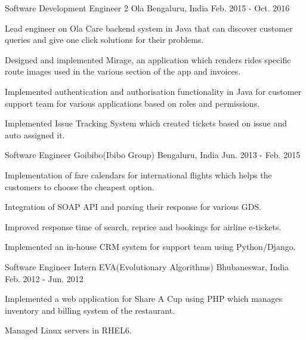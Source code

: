 \begin{cventries}
  \cventry
    {Software Development Engineer 2} %
    {Ola} %
    {Bengaluru, India} %
    {Feb. 2015 - Oct. 2016} %
    {
      \begin{cvitems} %
        \item {Lead engineer on Ola Care backend system in Java that can discover customer queries and give one click solutions for their problems.}
        \item {Designed and implemented Mirage, an application which renders rides specific route images used in the various section of the app and invoices.}
        \item {Implemented authentication and authorisation functionality in Java for customer support team for various applications based on roles and permissions.}
        \item {Implemented Issue Tracking System which created tickets based on issue and auto assigned it.}
      \end{cvitems}
    }
  \cventry
    {Software Engineer} %
    {Goibibo(Ibibo Group)} %
    {Bengaluru, India} %
    {Jun. 2013 - Feb. 2015} %
    {
      \begin{cvitems} %
        \item {Implementation of fare calendars for international flights which helps the customers to choose the cheapest option.}
        \item {Integration of SOAP API and parsing their response for various GDS.}
        \item {Improved response time of search, reprice and bookings for airline e-tickets.}
        \item {Implemented an in-house CRM system for support team using Python/Django.}
      \end{cvitems}
    }

  \cventry
    {Software Engineer Intern} %
    {EVA(Evolutionary Algorithms)}
    {Bhubaneswar, India} %
    {Feb. 2012 - Jun. 2012} %
    {
      \begin{cvitems} %
        \item {Implemented a web application for Share A Cup using PHP which manages inventory and billing system of the restaurant.}
        \item {Managed Linux servers in RHEL6.}
      \end{cvitems}
    }

\end{cventries}
